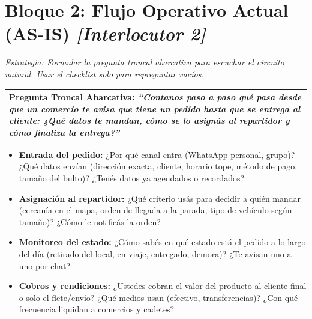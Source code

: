 \documentclass[11pt,a4paper]{article}
\begin{document}
\section*{Bloque 2: Flujo Operativo Actual (AS-IS) \hfill \normalfont\small\itshape [Interlocutor 2]}
\noindent
\textit{\small Estrategia: Formular la pregunta troncal abarcativa para escuchar el circuito natural. Usar el checklist solo para repreguntar vacíos.}

\vspace{3pt}
\noindent
\begin{tabularx}{\textwidth}{|X|}
\hline
\textbf{Pregunta Troncal Abarcativa:}
\textit{``Contanos paso a paso qué pasa desde que un comercio te avisa que tiene un pedido hasta que se entrega al cliente: ¿Qué datos te mandan, cómo se lo asignás al repartidor y cómo finaliza la entrega?''} \\
\hline
\end{tabularx}

\vspace{10pt}

\begin{itemize}[label={[\quad]}]
  \item \textbf{Entrada del pedido:} ¿Por qué canal entra (WhatsApp personal, grupo)? ¿Qué datos envían (dirección exacta, cliente, horario tope, método de pago, tamaño del bulto)? ¿Tenés datos ya agendados o recordados?
  \item \textbf{Asignación al repartidor:} ¿Qué criterio usás para decidir a quién mandar (cercanía en el mapa, orden de llegada a la parada, tipo de vehículo según tamaño)? ¿Cómo le notificás la orden?
  \item \textbf{Monitoreo del estado:} ¿Cómo sabés en qué estado está el pedido a lo largo del día (retirado del local, en viaje, entregado, demora)? ¿Te avisan uno a uno por chat?
  \item \textbf{Cobros y rendiciones:} ¿Ustedes cobran el valor del producto al cliente final o solo el flete/envío? ¿Qué medios usan (efectivo, transferencias)? ¿Con qué frecuencia liquidan a comercios y cadetes?
\end{itemize}

\clearpage

\end{document}
